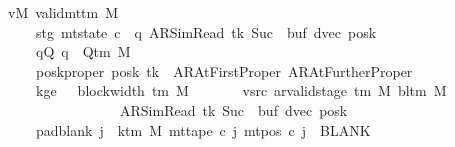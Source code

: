 \begin{isabellebody}
\ \ \ vM{\isacharcolon}{\kern0pt}\ {\isachardoublequoteopen}valid{\isacharunderscore}{\kern0pt}mttm\ M{\isachardoublequoteclose}\isanewline
\ \ \ \ \ \ \ stg{\isacharcolon}{\kern0pt}\ {\isachardoublequoteopen}mt{\isacharunderscore}{\kern0pt}state\ c{\isacharprime}{\kern0pt}\ {\isacharequal}{\kern0pt}\ {\isacharparenleft}{\kern0pt}q{\isacharcomma}{\kern0pt}\ AR{\isacharunderscore}{\kern0pt}SimRead{\isacharcomma}{\kern0pt}\ tk{\isacharcomma}{\kern0pt}\ Suc\ {}{\isacharcomma}{\kern0pt}\ buf{\isacharcomma}{\kern0pt}\ dvec{\isacharcomma}{\kern0pt}\ posk{\isacharparenright}{\kern0pt}{\isachardoublequoteclose}\isanewline
\ \ \ \ \ \ \ qQ{\isacharcolon}{\kern0pt}\ {\isachardoublequoteopen}q\ {\isasymin}\ Q{\isacharunderscore}{\kern0pt}tm\ M{\isachardoublequoteclose}\isanewline
\ \ \ \ \ \ \ posk{\isacharunderscore}{\kern0pt}proper{\isacharcolon}{\kern0pt}\ {\isachardoublequoteopen}posk\ tk\ {\isasymin}\ {\isacharbraceleft}{\kern0pt}AR{\isacharunderscore}{\kern0pt}AtFirstProper{\isacharcomma}{\kern0pt}\ AR{\isacharunderscore}{\kern0pt}AtFurtherProper{\isacharbraceright}{\kern0pt}{\isachardoublequoteclose}\isanewline
\ \ \ \ \ \ \ kge{}{\isacharcolon}{\kern0pt}\ {\isachardoublequoteopen}{}\ {\isasymle}\ block{\isacharunderscore}{\kern0pt}width\ {\isacharparenleft}{\kern0pt}{\isasymGamma}{\isacharunderscore}{\kern0pt}tm\ M{\isacharparenright}{\kern0pt}{\isachardoublequoteclose}\isanewline
\ \ \ \ \ \ \ vsrc{\isacharcolon}{\kern0pt}\ {\isachardoublequoteopen}ar{\isacharunderscore}{\kern0pt}valid{\isacharunderscore}{\kern0pt}stage\ {\isacharparenleft}{\kern0pt}{\isasymGamma}{\isacharunderscore}{\kern0pt}tm\ M{\isacharparenright}{\kern0pt}\ {\isacharparenleft}{\kern0pt}bl{\isacharunderscore}{\kern0pt}tm\ M{\isacharparenright}{\kern0pt}\isanewline
\ \ \ \ \ \ \ \ \ \ \ \ \ \ \ \ \ \ \ {\isacharparenleft}{\kern0pt}AR{\isacharunderscore}{\kern0pt}SimRead{\isacharcomma}{\kern0pt}\ tk{\isacharcomma}{\kern0pt}\ Suc\ {}{\isacharcomma}{\kern0pt}\ buf{\isacharcomma}{\kern0pt}\ dvec{\isacharcomma}{\kern0pt}\ posk{\isacharparenright}{\kern0pt}{\isachardoublequoteclose}\isanewline
\ \ \ \ \ \ \ pad{\isacharunderscore}{\kern0pt}blank{\isacharcolon}{\kern0pt}\ {\isachardoublequoteopen}{\isasymforall}j\ {\isasymge}\ k{\isacharunderscore}{\kern0pt}tm\ M{\isachardot}{\kern0pt}\ mt{\isacharunderscore}{\kern0pt}tape\ c{\isacharprime}{\kern0pt}\ j\ {\isacharparenleft}{\kern0pt}mt{\isacharunderscore}{\kern0pt}pos\ c{\isacharprime}{\kern0pt}\ j{\isacharparenright}{\kern0pt}\ {\isacharequal}{\kern0pt}\ BLANK{}{\isachardoublequoteclose}\isanewline

\end{isabellebody}
